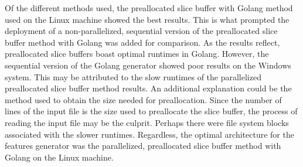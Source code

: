 Of the different methods used, the preallocated slice buffer with Golang method used on the Linux machine showed the best results. This is what prompted the deployment of a non-parallelized, sequential version of the preallocated slice buffer method with Golang was added for comparison. As the results reflect, preallocated slice buffers boast optimal runtimes in Golang. However, the sequential version of the Golang generator showed poor results on the Windows system. This may be attributed to the slow runtimes of the parallelized preallocated slice buffer method results. An additional explanation could be the method used to obtain the size needed for preallocation. Since the number of lines of the input file is the size used to preallocate the slice buffer, the process of reading the input file may be the culprit. Perhaps there were file system blocks associated with the slower runtimes. Regardless, the optimal architecture for the features generator was the parallelized, preallocated slice buffer method with Golang on the Linux machine.
